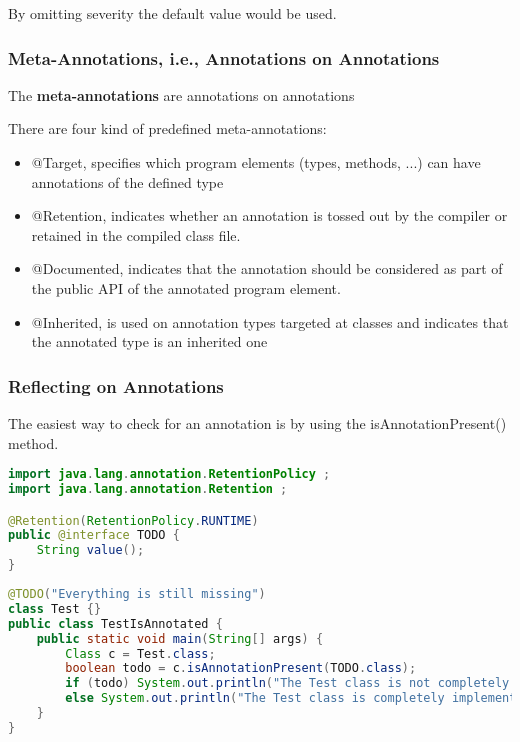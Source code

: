 By omitting severity the default value would be used.


\subsubsection{Meta-Annotations, i.e., Annotations on Annotations}

The \textbf{meta-annotations} are annotations on annotations

There are four kind of predefined meta-annotations:

\begin{itemize}
	\item @Target, specifies which program elements (types, methods, ...) can have annotations of the defined type
	\item  @Retention, indicates whether an annotation is tossed out by the compiler or retained in the compiled class file.
	\item @Documented, indicates that the annotation should be considered as part of the public API of the annotated program element.
	\item @Inherited, is used on annotation types targeted at classes and indicates that the annotated type is an inherited one
\end{itemize}

\subsubsection{Reflecting on Annotations}

The easiest way to check for an annotation is by using the isAnnotationPresent() method.

\begin{lstlisting}[language=Java]
import java.lang.annotation.RetentionPolicy ;
import java.lang.annotation.Retention ;

@Retention(RetentionPolicy.RUNTIME)
public @interface TODO {
	String value();
}
\end{lstlisting}

\begin{lstlisting}[language=Java]
@TODO("Everything is still missing")
class Test {}
public class TestIsAnnotated {
	public static void main(String[] args) {
		Class c = Test.class;
		boolean todo = c.isAnnotationPresent(TODO.class);
		if (todo) System.out.println("The Test class is not completely implemented yet");
		else System.out.println("The Test class is completely implemented");
	}
}
\end{lstlisting}

